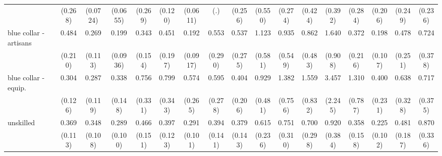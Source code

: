 {\begin{tabular}{l*{16}{c}}
                    &     (0.268)         &    (0.0724)         &    (0.0655)         &     (0.269)         &     (0.120)         &    (0.0611)         &         (.)         &     (0.256)         &     (0.550)         &     (0.274)         &     (0.424)         &     (0.392)         &     (0.284)         &     (0.206)         &     (0.249)         &     (0.236)         \\
[1em]
blue collar - artisans&       0.484         &       0.269\sym{**} &       0.199\sym{***}&       0.343\sym{*}  &       0.451         &       0.192\sym{***}&       0.553         &       0.537         &       1.123         &       0.935         &       0.862         &       1.640         &       0.372         &       0.198\sym{**} &       0.478         &       0.724         \\
                    &     (0.210)         &     (0.113)         &    (0.0936)         &     (0.154)         &     (0.197)         &    (0.0917)         &     (0.290)         &     (0.275)         &     (0.581)         &     (0.549)         &     (0.483)         &     (0.908)         &     (0.216)         &     (0.107)         &     (0.251)         &     (0.378)         \\
[1em]
blue collar - equip.&       0.304\sym{**} &       0.287\sym{**} &       0.338\sym{*}  &       0.756         &       0.799         &       0.574         &       0.595         &       0.404         &       0.929         &       1.382         &       1.559         &       3.457         &       1.310         &       0.400         &       0.638         &       0.717         \\
                    &     (0.126)         &     (0.119)         &     (0.148)         &     (0.331)         &     (0.343)         &     (0.265)         &     (0.278)         &     (0.206)         &     (0.481)         &     (0.756)         &     (0.832)         &     (2.245)         &     (0.787)         &     (0.231)         &     (0.328)         &     (0.375)         \\
[1em]
unskilled           &       0.369\sym{**} &       0.348\sym{***}&       0.289\sym{***}&       0.466\sym{*}  &       0.397\sym{**} &       0.291\sym{***}&       0.394\sym{**} &       0.379\sym{*}  &       0.615         &       0.751         &       0.700         &       0.920         &       0.358\sym{*}  &       0.225\sym{**} &       0.481         &       0.870         \\
                    &     (0.113)         &     (0.108)         &     (0.100)         &     (0.151)         &     (0.123)         &     (0.101)         &     (0.141)         &     (0.143)         &     (0.236)         &     (0.310)         &     (0.298)         &     (0.384)         &     (0.158)         &     (0.102)         &     (0.187)         &     (0.336)         \\

\end{tabular}}
